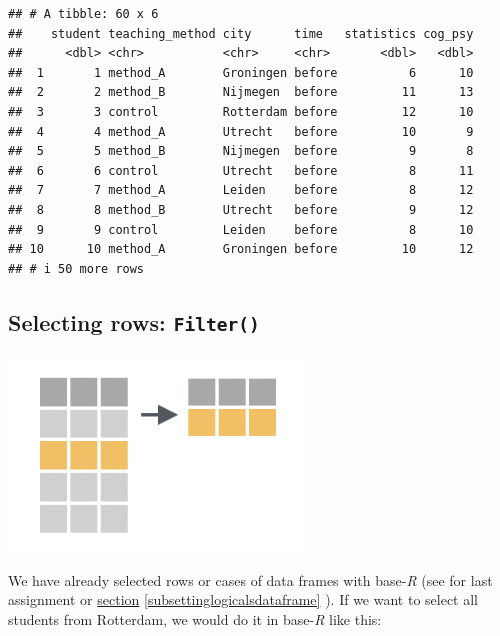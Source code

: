 \documentclass[
]{scrartcl}
\newenvironment{Shaded}{\begin{snugshade}}{\end{snugshade}}
\newcommand{\NormalTok}[1]{#1}
\newcommand{\OperatorTok}[1]{\textcolor[rgb]{0.81,0.36,0.00}{\textbf{#1}}}
\newcommand{\StringTok}[1]{\textcolor[rgb]{0.31,0.60,0.02}{#1}}
\begin{document}
\begin{verbatim}
## # A tibble: 60 x 6
##    student teaching_method city      time   statistics cog_psy
##      <dbl> <chr>           <chr>     <chr>       <dbl>   <dbl>
##  1       1 method_A        Groningen before          6      10
##  2       2 method_B        Nijmegen  before         11      13
##  3       3 control         Rotterdam before         12      10
##  4       4 method_A        Utrecht   before         10       9
##  5       5 method_B        Nijmegen  before          9       8
##  6       6 control         Utrecht   before          8      11
##  7       7 method_A        Leiden    before          8      12
##  8       8 method_B        Utrecht   before          9      12
##  9       9 control         Leiden    before          8      10
## 10      10 method_A        Groningen before         10      12
## # i 50 more rows
\end{verbatim}

\hypertarget{selecting-rows-filter}{%
\subsection{\texorpdfstring{Selecting rows: \texttt{Filter()}}{Selecting rows: Filter()}}\label{selecting-rows-filter}}

\begin{center}\includegraphics[width=300px]{images/dplyr-filter} \end{center}

We have already selected rows or cases of data frames with base-\emph{R} (see for last assignment or \protect\hyperlink{subsettinglogicalsdataframe}{section} \ref{subsettinglogicalsdataframe} ). If we want to select all students from Rotterdam, we would do it in base-\emph{R} like this:

\begin{Shaded}
\end{Shaded}
\end{document}
